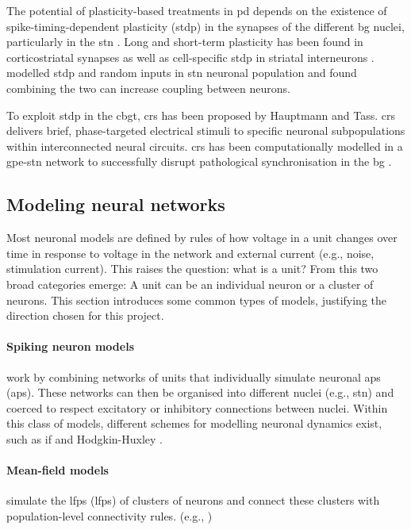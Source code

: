 The potential of plasticity-based treatments in \acrshort{pd} depends on the existence of
spike-timing-dependent plasticity (\acrshort{stdp}) in the synapses of the different \acrshort{bg} nuclei, particularly
in the \acrshort{stn} \cite{rubin2012basal}. Long and short-term plasticity has been found in
corticostriatal synapses \cite{kreitzer2008striatal, di2009short} as well as cell-specific \acrshort{stdp} in
striatal interneurons \cite{fino2010spike}.
\cite{thieu2024role} modelled \acrshort{stdp} and random inputs in \acrshort{stn} neuronal population and found combining the two can
increase coupling between neurons.

To exploit \acrshort{stdp} in the \acrshort{cbgt}, \acrfull{crs} has been proposed by Hauptmann and Tass.
\acrshort{crs} delivers brief, phase-targeted electrical stimuli to specific neuronal subpopulations within interconnected
neural circuits.
\acrshort{crs} has been computationally modelled in a \acrfull{gpe}-\acrshort{stn} network to successfully disrupt pathological
synchronisation in the \acrshort{bg} \cite{hauptmann2009cumulative, hauptmann2010restoration}.

\subsection{Modeling neural networks}
Most neuronal models are defined by rules of how voltage in a unit changes
over time in response to voltage in the network and external current (e.g., noise, stimulation
current).
This raises the question: what is a unit? From this two broad categories emerge: A unit can be an individual neuron or a cluster of neurons. This section introduces
some common types of models, justifying the direction chosen for this project.

\paragraph{Spiking neuron models} work by combining networks of units that individually
simulate neuronal \acrlong{ap}s (\acrshort{ap}s).
These networks can then be organised into different nuclei (e.g., \acrshort{stn}) and coerced to respect
excitatory or inhibitory connections between nuclei.
Within this class of models, different schemes for modelling neuronal dynamics exist,
such as \acrfull{if} \cite{gerstner2014if} and Hodgkin-Huxley
\cite{hodgkin1952measurement, gerstner2014hh}.

\paragraph{Mean-field models} simulate the \acrlong{lfp}s (\acrshort{lfp}s) of clusters of neurons
and connect these clusters with population-level connectivity rules. (e.g.,
\cite{jansen1995electroencephalogram, west2022stimulating})

